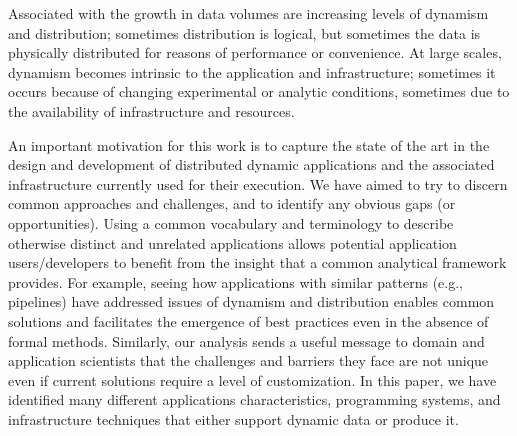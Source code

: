 Associated with the growth in data volumes are increasing levels of dynamism and
distribution; sometimes distribution is logical, but sometimes the data is
physically distributed for reasons of performance or convenience. At large
scales, dynamism becomes intrinsic to the application and infrastructure;
sometimes it occurs because of changing experimental or analytic conditions,
sometimes due to the availability of infrastructure and resources.

An important motivation for this work is to capture the state of the art in the
design and development of distributed dynamic applications and the associated
infrastructure currently used for their execution. We have aimed to try to
discern common approaches and challenges, and to identify any obvious gaps (or
opportunities). Using a common vocabulary and terminology to describe otherwise
distinct and unrelated applications allows potential application
users/developers to benefit from the insight that a common analytical framework
provides. For example, seeing how applications with similar patterns (e.g.,
pipelines) have addressed issues of dynamism and distribution enables common
solutions and facilitates the emergence of best practices even in the absence of
formal methods.  Similarly, our analysis sends a useful message to domain and
application scientists that the challenges and barriers they face are not unique
even if current solutions require a level of customization.  In this paper, we
have identified many different applications characteristics, programming
systems, and infrastructure techniques that either support dynamic data or
produce it.



